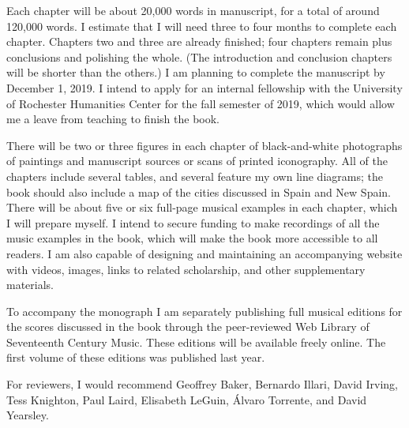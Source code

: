 \documentclass{vcbook-proposal}
\begin{document}
Each chapter will be about 20,000 words in manuscript, for a total of around
120,000 words.
I estimate that I will need three to four months to complete each chapter.
Chapters two and three are already finished; four chapters remain plus
conclusions and polishing the whole.
(The introduction and conclusion chapters will be shorter than the others.)
I am planning to complete the manuscript by December 1, 2019.
I intend to apply for an internal fellowship with the University of Rochester
Humanities Center for the fall semester of 2019, which would allow me a leave
from teaching to finish the book.

There will be two or three figures in each chapter of black-and-white
photographs of paintings and manuscript sources or scans of printed iconography.
All of the chapters include several tables, and several feature my own line
diagrams; the book should also include a map of the cities discussed in Spain
and New Spain.  
There will be about five or six full-page musical examples in each chapter,
which I will prepare myself.
I intend to secure funding to make recordings of all the music examples in the
book, which will make the book more accessible to all readers.
I am also capable of designing and maintaining an accompanying website with
videos, images, links to related scholarship, and other supplementary materials.

To accompany the monograph I am separately publishing full musical editions for
the scores discussed in the book through the peer-reviewed Web Library of
Seventeenth Century Music.%
    \Autocite{Cashner:WLSCM32}
These editions will be available freely online.
The first volume of these editions was published last year.

For reviewers, I would recommend Geoffrey Baker, Bernardo Illari, David Irving,
Tess Knighton, Paul Laird, Elisabeth LeGuin, Álvaro Torrente, and David
Yearsley.
\end{document}
